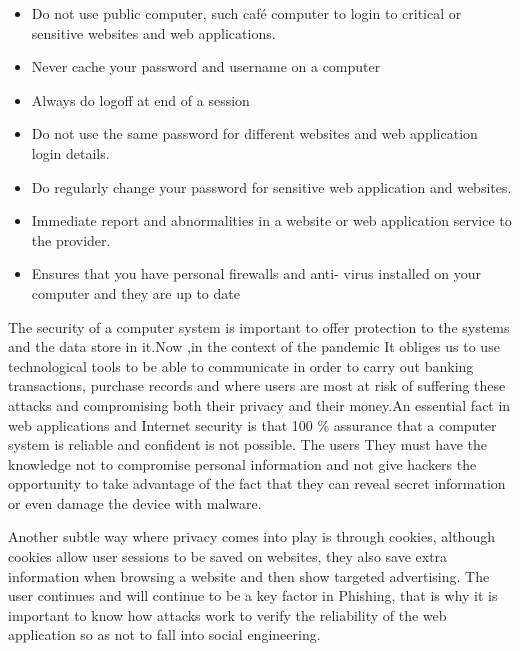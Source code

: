 \documentclass[12pt]{article}
\begin{document}
\begin{itemize}
\item  Do not use public computer, such café computer to
login to critical or sensitive websites and web
applications.
\item  Never cache your password and username on a
computer

\item Always do logoff at end of a session
\item Do  not use the same password for different
websites and web application login details.

\item  Do regularly change your password for sensitive
web application and websites.

\item Immediate report and abnormalities in a website or
web application service to the provider.

\item Ensures that you have personal firewalls and anti-
virus installed on your computer and they are up to
date
\end{itemize}

\vspace{15PT}


The security of a computer system is important to offer protection to the systems and the data store in it.Now ,in the context of the pandemic
It obliges us to use technological tools to be able to communicate in order to carry out banking transactions, purchase records and where users are most at risk of suffering these attacks and compromising both their privacy and their money.An essential fact in web applications and Internet security
is that 100 \% assurance that a computer system is reliable and
confident is not possible. 
The users
They must have the knowledge not to compromise personal information and not give hackers the opportunity to take advantage of the fact that they can reveal secret information or even damage the device with malware.

Another subtle way where privacy comes into play is through cookies, although cookies allow user sessions to be saved on websites, they also save extra information when browsing a website and then show targeted advertising.
The user continues and will continue to be a key factor in Phishing, that is why it is important to know how attacks work to verify the reliability of the web application so as not to fall into social engineering.


\vspace{30pt}
\end{document}
